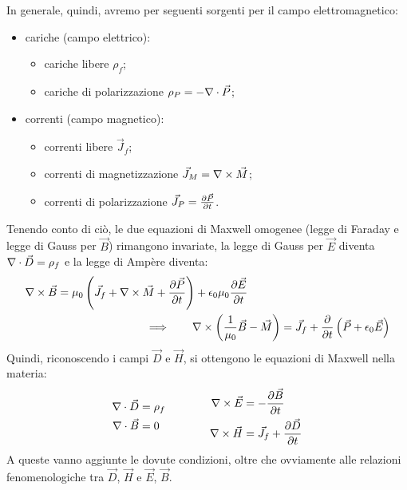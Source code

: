 In generale, quindi, avremo per seguenti sorgenti per il campo elettromagnetico:
\begin{itemize}
	\item cariche (campo elettrico):
	\begin{itemize}
		\item cariche libere $ \rho_f $;
		\item cariche di polarizzazione $ \rho_P = -\nabla\cdot\vec{P} $;
	\end{itemize}
	\item correnti (campo magnetico):
	\begin{itemize}
		\item correnti libere $ \vec{J}_f $;
		\item correnti di magnetizzazione $ \vec{J}_M = \nabla\times\vec{M} $;
		\item correnti di polarizzazione $ \vec{J}_P = \frac{\partial\vec{P}}{\partial t} $.
	\end{itemize}
\end{itemize}
Tenendo conto di ciò, le due equazioni di Maxwell omogenee (legge di Faraday e legge di Gauss per $ \vec{B} $) rimangono invariate, la legge di Gauss per $ \vec{E} $ diventa $ \nabla\cdot\vec{D} = \rho_f $ e la legge di Ampère diventa:
\begin{equation}
	\begin{split}
		\nabla\times\vec{B} &= \mu_0 \left( \vec{J}_f + \nabla\times\vec{M} + \frac{\partial\vec{P}}{\partial t} \right) + \epsilon_0 \mu_0 \frac{\partial\vec{E}}{\partial t} \\ 
			    &\qquad\qquad\qquad\qquad\Longrightarrow\qquad \nabla\times\left(\frac{1}{\mu_0} \vec{B} - \vec{M}\right) = \vec{J}_f + \frac{\partial}{\partial t} \left(\vec{P} + \epsilon_0 \vec{E}\right)
	\end{split}
	\label{eq:5}
\end{equation}
Quindi, riconoscendo i campi $ \vec{D} $ e $ \vec{H} $, si ottengono le equazioni di Maxwell nella materia:
\begin{equation}
	\begin{split}
		\nabla\cdot\vec{D} &= \rho_f \\ 
		\nabla\cdot\vec{B} &= 0 
	\end{split}
	\qquad\qquad
	\begin{split}
		\nabla\times\vec{E} &= - \frac{\partial\vec{B}}{\partial t} \\ 
		\nabla\times\vec{H} &= \vec{J}_f + \frac{\partial\vec{D}}{\partial t}
	\end{split}
	\label{eq:6}
\end{equation}
A queste vanno aggiunte le dovute condizioni, oltre che ovviamente alle relazioni fenomenologiche tra $ \vec{D} $, $ \vec{H} $ e $ \vec{E} $, $	\vec{B} $. \\ 
